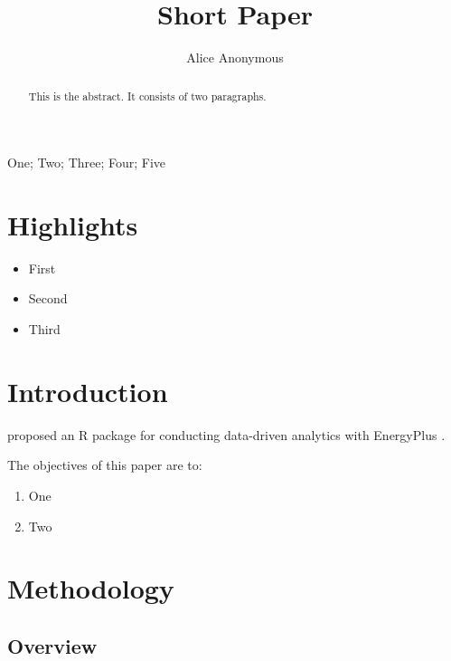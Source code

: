 \documentclass[]{elsarticle} %
\providecommand{\tightlist}{%
  \setlength{\itemsep}{0pt}\setlength{\parskip}{0pt}}
\begin{document}
\begin{frontmatter}

  \title{Short Paper}
    \author[Some Institute]{Alice Anonymous}
      \address[Some Institute]{Department, Street, City, State, Zip}
  
  \begin{abstract}
  This is the abstract.
  It consists of two paragraphs.
  \end{abstract}
   \begin{keyword} One; Two; Three; Four; Five\end{keyword}
 \end{frontmatter}

\hypertarget{highlights}{%
\section*{Highlights}\label{highlights}}

\begin{itemize}
\tightlist
\item
  First
\item
  Second
\item
  Third
\end{itemize}

\hypertarget{introduction}{%
\section{Introduction}\label{introduction}}

\citet{jia2021eplusr} proposed an R package for conducting data-driven analytics with
EnergyPlus \citep{crawley2001energyplus}.

The objectives of this paper are to:

\begin{enumerate}
\def\labelenumi{\arabic{enumi}.}
\tightlist
\item
  One
\item
  Two
\end{enumerate}

\hypertarget{methodology}{%
\section{Methodology}\label{methodology}}

\hypertarget{overview}{%
\subsection{Overview}\label{overview}}
\end{document}
